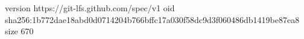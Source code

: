 version https://git-lfs.github.com/spec/v1
oid sha256:1b772dae18abd0d0714204b766bffc17a030f58dc9d3f060486db1419be87ea8
size 670
